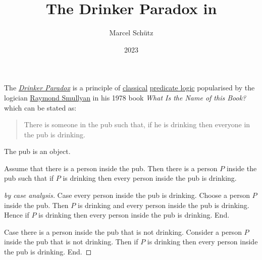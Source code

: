 \documentclass[english]{article}
\begin{document}
\title{The Drinker Paradox in \Naproche}
\author{Marcel Schütz}
\date{2023}
\maketitle

\noindent The \href{https://en.wikipedia.org/wiki/Drinker_paradox}{\emph{Drinker Paradox}} is a principle of \href{https://en.wikipedia.org/wiki/Classical_logic}{classical} \href{https://en.wikipedia.org/wiki/First-order_logic}{predicate logic} popularised by the logician \href{https://en.wikipedia.org/wiki/Raymond_Smullyan}{Raymond Smullyan} in his 1978 book \textit{What Is the Name of this Book?} \cite{Smullyan1978} which can be stated as:

\begin{quotation}
  \noindent There is someone in the pub such that, if he is drinking then everyone in the pub is drinking.
\end{quotation}

\begin{forthel}

  \begin{signature*}
    The pub is an object.
  \end{signature*}

  \begin{theorem*}\label{drinker_paradox}
    Assume that there is a person inside the pub.
    Then there is a person $P$ inside the pub such that if $P$ is drinking then every person inside the pub is drinking.
  \end{theorem*}
  \begin{proof}[by case analysis]
    Case every person inside the pub is drinking.
      Choose a person $P$ inside the pub.
      Then $P$ is drinking and every person inside the pub is drinking.
      Hence if $P$ is drinking then every person inside the pub is drinking.
    End.

    Case there is a person inside the pub that is not drinking.
      Consider a person $P$ inside the pub that is not drinking.
      Then if $P$ is drinking then every person inside the pub is drinking.
    End.
  \end{proof}
\end{forthel}

\printbibliography
\vfill
\doclicenseThis
\end{document}
